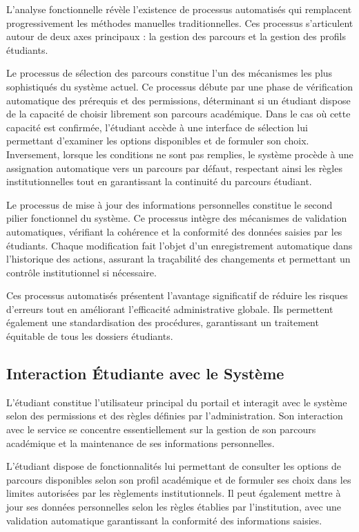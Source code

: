 \documentclass[12pt,a4paper]{report}
\begin{document}
L'analyse fonctionnelle révèle l'existence de processus automatisés qui remplacent progressivement les méthodes manuelles traditionnelles. Ces processus s'articulent autour de deux axes principaux : la gestion des parcours et la gestion des profils étudiants.

Le processus de sélection des parcours constitue l'un des mécanismes les plus sophistiqués du système actuel. Ce processus débute par une phase de vérification automatique des prérequis et des permissions, déterminant si un étudiant dispose de la capacité de choisir librement son parcours académique. Dans le cas où cette capacité est confirmée, l'étudiant accède à une interface de sélection lui permettant d'examiner les options disponibles et de formuler son choix. Inversement, lorsque les conditions ne sont pas remplies, le système procède à une assignation automatique vers un parcours par défaut, respectant ainsi les règles institutionnelles tout en garantissant la continuité du parcours étudiant.

Le processus de mise à jour des informations personnelles constitue le second pilier fonctionnel du système. Ce processus intègre des mécanismes de validation automatiques, vérifiant la cohérence et la conformité des données saisies par les étudiants. Chaque modification fait l'objet d'un enregistrement automatique dans l'historique des actions, assurant la traçabilité des changements et permettant un contrôle institutionnel si nécessaire.

Ces processus automatisés présentent l'avantage significatif de réduire les risques d'erreurs tout en améliorant l'efficacité administrative globale. Ils permettent également une standardisation des procédures, garantissant un traitement équitable de tous les dossiers étudiants.

\subsection{Interaction Étudiante avec le Système}

L'étudiant constitue l'utilisateur principal du portail et interagit avec le système selon des permissions et des règles définies par l'administration. Son interaction avec le service se concentre essentiellement sur la gestion de son parcours académique et la maintenance de ses informations personnelles.

L'étudiant dispose de fonctionnalités lui permettant de consulter les options de parcours disponibles selon son profil académique et de formuler ses choix dans les limites autorisées par les règlements institutionnels. Il peut également mettre à jour ses données personnelles selon les règles établies par l'institution, avec une validation automatique garantissant la conformité des informations saisies.
\end{document}
